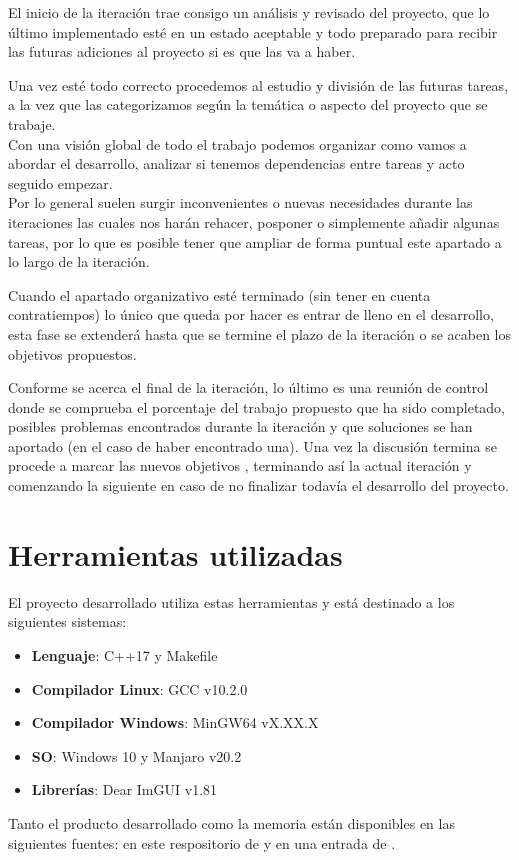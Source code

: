 El inicio de la iteración trae consigo un análisis y revisado del proyecto, que lo último
implementado esté en un estado aceptable y todo preparado para recibir las futuras adiciones
al proyecto si es que las va a haber.

Una vez esté todo correcto procedemos al estudio y división de las futuras tareas, a la vez 
que las categorizamos según la temática o aspecto del proyecto que se trabaje. \\
Con una visión global de todo el trabajo podemos organizar como vamos a
abordar el desarrollo, analizar si tenemos dependencias entre tareas y acto seguido empezar. \\
Por lo general suelen surgir inconvenientes o nuevas necesidades durante las iteraciones las
cuales nos harán rehacer, posponer o simplemente añadir algunas tareas, por lo que es posible
tener que ampliar de forma puntual este apartado a lo largo de la iteración.

Cuando el apartado organizativo esté terminado (sin tener en cuenta contratiempos) lo único 
que queda por hacer es entrar de lleno en el desarrollo, esta fase se extenderá hasta que
se termine el plazo de la iteración o se acaben los objetivos propuestos. 

Conforme se acerca el final de la iteración, lo último es una reunión de control donde 
se comprueba el porcentaje del trabajo propuesto que ha sido completado, posibles problemas 
encontrados durante la iteración y que soluciones se han aportado (en el caso de haber 
encontrado una). Una vez la discusión termina se procede a marcar las nuevos objetivos
, terminando así la actual iteración y comenzando la siguiente en caso de no finalizar 
todavía el desarrollo del proyecto.


\section{Herramientas utilizadas}
El proyecto desarrollado utiliza estas herramientas y está destinado a los siguientes
sistemas:
\begin{itemize}
	\item \textbf{Lenguaje}: C++17 y Makefile
	\item \textbf{Compilador Linux}: GCC v10.2.0
	\item \textbf{Compilador Windows}: MinGW64 vX.XX.X
	\item \textbf{SO}: Windows 10 y Manjaro v20.2
	\item \textbf{Librerías}: Dear ImGUI v1.81
\end{itemize}

Tanto el producto desarrollado como la memoria están disponibles en las siguientes fuentes: 
en este respositorio de \citeauthor*{BPW_GitHub_2021} y en una entrada de \citeauthor*{BPW_Archive_2021}.





